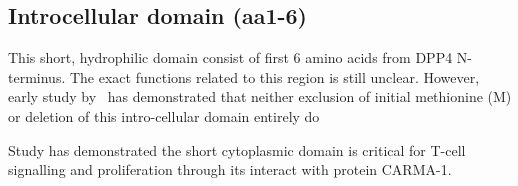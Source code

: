 \subsection{Introcellular domain (aa1-6)}

This short, hydrophilic domain consist of first 6 amino acids from DPP4 N-terminus. The exact functions related to this region is still unclear. However, early study by~\citet{Hong1990} has demonstrated that neither exclusion of initial methionine (M) or deletion of this intro-cellular domain entirely do 

Study has demonstrated the short cytoplasmic domain is critical for T-cell signalling and proliferation through its interact with protein CARMA-1. \cite{Ohnuma_2007}